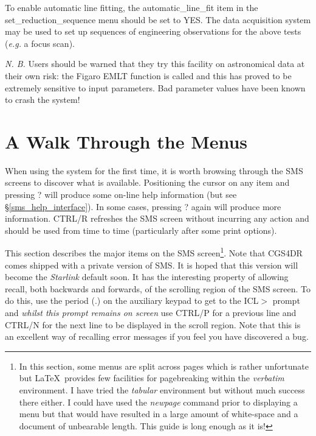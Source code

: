 {To enable automatic line fitting, the {\sf automatic\_line\_fit} item in 
the {\sf set\_reduction\_sequence} menu should be set to {\sf YES}.
The data acquisition system may be used to set up sequences of 
engineering observations for the above tests ({\em e.g.} a focus scan).

{\em N. B.} Users should be warned that they try this facility on astronomical
data at their own risk: the Figaro EMLT function is called and this has proved
to be extremely sensitive to input parameters. Bad parameter values have
been known to crash the system!

\newpage
\markright{\stardocname}
\section{A Walk Through the Menus}
\label{a_walk_through_the_menus}

When using the system for the first time, it is worth browsing through
the SMS screens to discover what is available. Positioning the cursor on 
any item and pressing {\sf ?} will produce some on-line help information (but
see \S \ref{sms_help_interface}).
In some cases, pressing {\sf ?} again will produce more information.
CTRL/R refreshes the SMS screen without incurring any action and should be
used from time to time (particularly after some print options).

This section describes the major items on the SMS screen\footnote{In this 
section, some menus are split across pages which is rather unfortunate but 
\LaTeX\ provides few facilities for pagebreaking within the {\em verbatim} 
environment. I have tried the {\em tabular} environment but without much 
success there either. I could have used the {\em newpage} command prior to 
displaying a menu but that would have resulted in a large amount of 
white-space and a document of unbearable length. This guide is long enough 
as it is!}.
Note that CGS4DR comes shipped with a private version of SMS. It is hoped that
this version will become the {\sl Starlink} default soon. It has the 
interesting property of allowing recall, both backwards and forwards, of
the scrolling region of the SMS screen. To do this, use the period (.) 
on the auxiliary keypad to get to 
the {\sf ICL$>$} prompt and {\em whilst this prompt remains on screen} use 
{\sf CTRL/P} for a previous line and {\sf CTRL/N} for the next line to be 
displayed in the scroll region. Note that this is an excellent way of 
recalling error messages if you feel you have discovered a bug.

}
